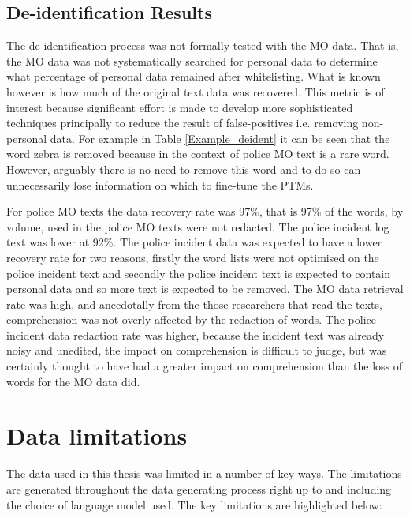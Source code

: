 \subsection{De-identification Results} The de-identification process was not formally tested with the MO data. That is, the MO data  was not systematically searched for personal data to determine what percentage of personal data remained after whitelisting. What is known however is how much of the original text data was recovered. This metric is of interest because significant effort is made to develop more sophisticated techniques principally to reduce the result of false-positives i.e. removing non-personal data.  For example in Table \ref{Example_deident} it can be seen that the word zebra is removed because in the context of police MO text  is a rare word. However, arguably there is no need to remove this word and to do so can unnecessarily lose information on which to fine-tune the PTMs. 

For police MO texts the data recovery rate was 97\%, that is 97\% of the words, by volume,  used in the police MO texts were not redacted. The police incident log  text was lower at 92\%. The police incident data was expected to have a lower recovery rate for two reasons, firstly the word lists were not optimised on the police incident text and secondly the police incident text is expected to contain personal data and so more text is expected to be removed. The MO data retrieval rate was high, and anecdotally from the those researchers that read the texts, comprehension was not overly affected by the redaction of words. The police incident data redaction rate was higher, because the incident text was already noisy and unedited, the impact on comprehension is difficult to judge, but was certainly thought to have had a greater impact on comprehension than the loss of words for the MO data did.  

\section{Data limitations} The data used in this thesis was limited in a number of key ways. The limitations are generated throughout the data generating process right up to and including the choice of language model used. The key limitations are highlighted below:

